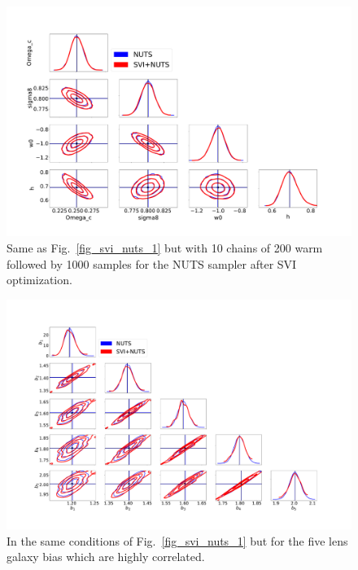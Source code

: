 \documentclass[final,5p,times,twocolumn,authoryear]{elsarticle}
\begin{document}
\begin{figure}
\includegraphics[width=\columnwidth]{figures/SVI_NUTS_10x200x1000.pdf}
\caption{Same as Fig.~\ref{fig_svi_nuts_1} but with 10 chains of 200 warm followed by 1000 samples for the NUTS sampler after SVI optimization.}
\label{fig_svi_nuts_3}
\end{figure}

\begin{figure}
\includegraphics[width=\columnwidth]{figures/SVI_NUTS_1x200x200_bis.pdf}
\caption{In the same conditions of Fig.~\ref{fig_svi_nuts_1} but for the five lens galaxy bias which are highly correlated.}
\label{fig_svi_nuts_4}
\end{figure}
\end{document}
